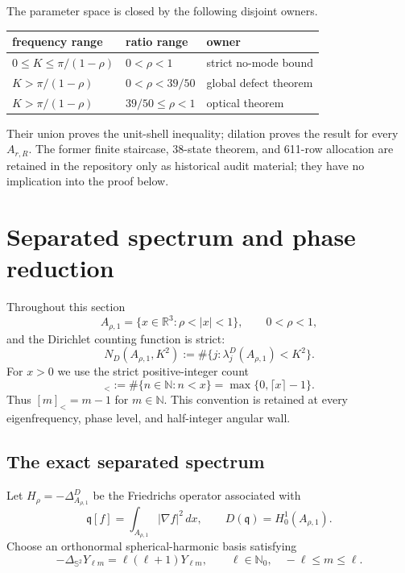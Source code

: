 \documentclass[11pt]{article}
\numberwithin{equation}{section}
\theoremstyle{definition}
\theoremstyle{remark}
\begin{document}
\begin{samepage}
The parameter space is closed by the following disjoint owners.
\begin{center}
\begin{tabular}{@{}lll@{}}
\toprule
frequency range&ratio range&owner\\
\midrule
\(0\leq K\leq\pi/(1-\rho)\)&\(0<\rho<1\)&strict no-mode bound\\
\(K>\pi/(1-\rho)\)&\(0<\rho<39/50\)&global defect theorem\\
\(K>\pi/(1-\rho)\)&\(39/50\leq\rho<1\)&optical theorem\\
\bottomrule
\end{tabular}
\end{center}
\end{samepage}
Their union proves the unit-shell inequality; dilation proves the result for
every \(A_{r,R}\).  The former finite staircase, 38-state theorem, and
611-row allocation are retained in the repository only as historical audit
material; they have no implication into the proof below.


\section{Separated spectrum and phase reduction}
\label{sec:sc-spectrum-small-hole}

Throughout this section
\[
  A_{\rho,1}=\{x\in\mathbb R^3:\rho<|x|<1\},
  \qquad 0<\rho<1,
\]
and the Dirichlet counting function is strict:
\[
  N_D(A_{\rho,1},K^2)
  :=\#\{j:\lambda_j^D(A_{\rho,1})<K^2\}.
\]
For \(x>0\) we use the strict positive-integer count
\begin{equation}
  [x]_<:=\#\{n\in\mathbb N:n<x\}
  =\max\{0,\lceil x\rceil-1\}.
  \label{eq:sc-strict-bracket}
\end{equation}
Thus \([m]_< =m-1\) for \(m\in\mathbb N\).  This convention is retained
at every eigenfrequency, phase level, and half-integer angular wall.

\subsection{The exact separated spectrum}

Let \(H_\rho=-\Delta^D_{A_{\rho,1}}\) be the Friedrichs operator associated
with
\[
  \mathfrak q[f]=\int_{A_{\rho,1}}|\nabla f|^2\,dx,
  \qquad D(\mathfrak q)=H_0^1(A_{\rho,1}).
\]
Choose an orthonormal spherical-harmonic basis satisfying
\[
  -\Delta_{\mathbb S^2}Y_{\ell m}
  =\ell(\ell+1)Y_{\ell m},
  \qquad \ell\in\mathbb N_0,
  \quad -\ell\le m\le\ell.
\]
\end{document}

